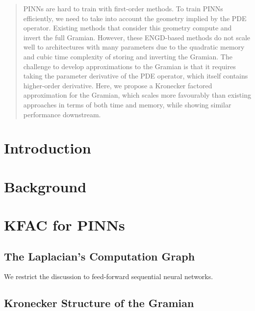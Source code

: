 \documentclass{article}
\begin{document}
\maketitle

\begin{abstract}
  PINNs are hard to train with first-order methods.
  To train PINNs efficiently, we need to take into account the geometry implied by the PDE operator.
  Existing methods that consider this geometry compute and invert the full Gramian.
  However, these ENGD-based methods do not scale well to architectures with many parameters due to the quadratic memory and cubic time complexity of storing and inverting the Gramian.
  The challenge to develop approximations to the Gramian is that it requires taking the parameter derivative of the PDE operator, which itself contains higher-order derivative.
  Here, we propose a Kronecker factored approximation for the Gramian, which scales more favourably than existing approaches in terms of both time and memory, while showing similar performance downstream.
\end{abstract}

\section{Introduction}



\section{Background}





\section{KFAC for PINNs}

\subsection{The Laplacian's Computation Graph}
We restrict the discussion to feed-forward sequential neural networks.


\subsection{Kronecker Structure of the Gramian}
\end{document}
